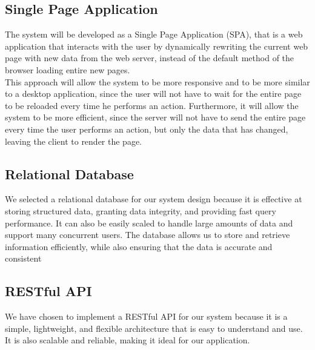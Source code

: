 \subsection{Single Page Application}
The system will be developed as a Single Page Application (SPA), that is a web application that interacts with the user by dynamically rewriting the current web page with new data from the web server, instead of the default method of the browser loading entire new pages.\\
This approach will allow the system to be more responsive and to be more similar to a desktop application, since the user will not have to wait for the entire page to be reloaded every time he performs an action. Furthermore, it will allow the system to be more efficient, since the server will not have to send the entire page every time the user performs an action, but only the data that has changed, leaving the client to render the page.

\subsection{Relational Database}
We selected a relational database for our system design because it is effective at storing structured data, granting data integrity, and providing fast query performance. It can also be easily scaled to handle large amounts of data and support many concurrent users. The database allows us to store and retrieve information efficiently, while also ensuring that the data is accurate and consistent

\subsection{RESTful API}
We have chosen to implement a RESTful API for our system because it is a simple, lightweight, and flexible architecture that is easy to understand and use. It is also scalable and reliable, making it ideal for our application.\\

